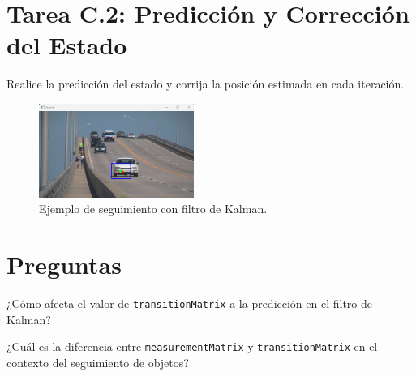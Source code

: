 \section*{Tarea C.2: Predicción y Corrección del Estado}
{}
Realice la predicción del estado y corrija la posición estimada en cada iteración.

\begin{figure}[H]
    \centering
    \includegraphics[width=0.45\textwidth]{Lab_4/template/figures/kalman.png}
    \caption{Ejemplo de seguimiento con filtro de Kalman.}
    \label{fig:ejemplo_track_kalman}
\end{figure}

\section*{Preguntas}

\vspace{5mm}
\begin{tcolorbox}[colback=gray!10, colframe=gray!30, coltitle=black, title=Pregunta C.1, halign=left]
¿Cómo afecta el valor de \texttt{transitionMatrix} a la predicción en el filtro de Kalman?
\end{tcolorbox}

\vspace{5mm}
\begin{tcolorbox}[colback=gray!10, colframe=gray!30, coltitle=black, title=Pregunta C.2, halign=left]
¿Cuál es la diferencia entre \texttt{measurementMatrix} y \texttt{transitionMatrix} en el contexto del seguimiento de objetos?
\end{tcolorbox}
